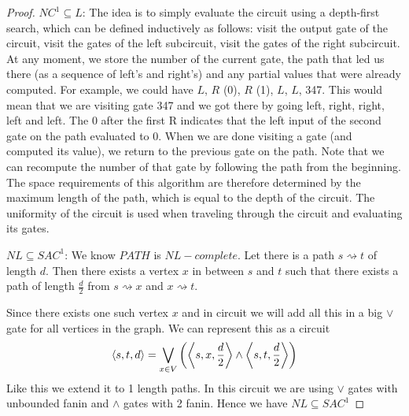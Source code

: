 \begin{proof}
		$NC^1\subseteq L$: The idea is to simply evaluate the circuit using a depth-first search, which can be defined inductively as follows: visit the output gate of the circuit, visit the gates of the left subcircuit, visit the gates of the right subcircuit. At any moment, we store the number of the current gate, the path that led us there (as a sequence of left’s and right’s) and any partial values that were already computed. For example, we could have $L$, $R$ (0), $R$ (1), $L$, $L$, 347. This would mean that we are visiting gate 347 and we got there by going left, right, right, left and left. The 0 after the first R indicates that the left input of the second gate on the path evaluated to 0. When we are done visiting a gate (and computed its value), we return to the previous gate on the path. Note that we can recompute the number of that gate by following the path from the beginning. The space requirements of this algorithm are therefore determined by the maximum length of the path, which is equal to the depth of the circuit. The uniformity of the circuit is used when traveling through the circuit and evaluating its gates. 
		
		$NL\subseteq SAC^1$: We know $PATH$ is $NL-complete$. Let there is a path $s\rightsquigarrow t$  of length $d$. Then there exists a vertex $x$ in between $s$ and $t$ such that there exists a path of length $\frac{d}{2}$ from $s\rightsquigarrow x$ and $x\rightsquigarrow t$. 
		\begin{center}
		\end{center}
 	Since there exists one such vertex $x$ and in circuit we will add all this in a big $\vee$ gate for all vertices in the graph. We can represent this as a circuit$$\left\langle s,t,d\right\rangle=\bigvee_{x\in V}\left(\left\langle s,x,\frac{d}{2}\right\rangle \wedge \left\langle s,t,\frac{d}{2}\right\rangle\right)$$Like this we extend it to 1 length paths. In this circuit we are using $\vee$ gates with unbounded fanin and $\wedge$ gates with 2 fanin. Hence we have $NL\subseteq SAC^1$
\end{proof}

